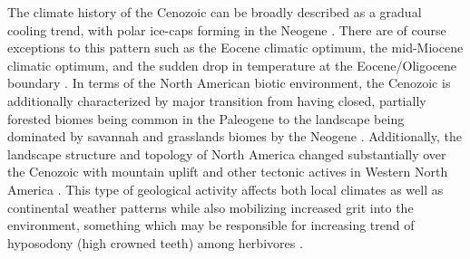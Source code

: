 The climate history of the Cenozoic can be broadly described as a gradual cooling trend, with polar ice-caps forming in the Neogene \citep{Zachos2001,Zachos2008,Cramer2011}. There are of course exceptions to this pattern such as the Eocene climatic optimum, the mid-Miocene climatic optimum, and the sudden drop in temperature at the Eocene/Oligocene boundary \citep{Zachos2001,Zachos2008}. In terms of the North American biotic environment, the Cenozoic is additionally characterized by major transition from having closed, partially forested biomes being common in the Paleogene to the landscape being dominated by savannah and grasslands biomes by the Neogene \citep{Blois2009,Janis1993b,Janis2000,Stromberg2005}. Additionally, the landscape structure and topology of North America changed substantially over the Cenozoic with mountain uplift and other tectonic actives in Western North America \citep{Blois2009,Eronen2015,Janis2008a,Badgley2013}. This type of geological activity affects both local climates as well as continental weather patterns while also mobilizing increased grit into the environment, something which may be responsible for increasing trend of hyposodony (high crowned teeth) among herbivores \citep{Jardine2012,Jernvall2002,Damuth2011}.


